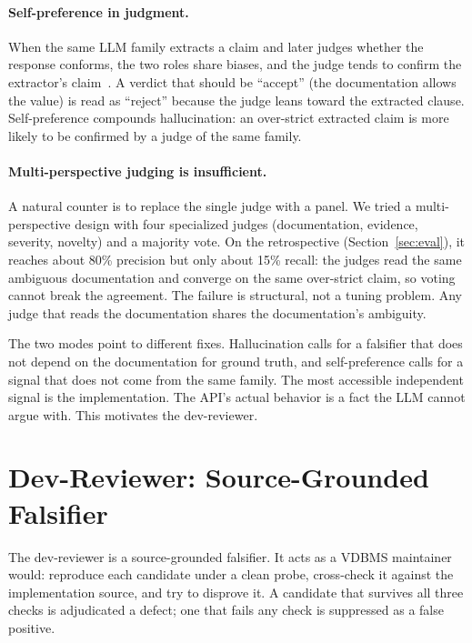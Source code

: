 \documentclass[sigconf]{acmart}
\begin{document}
\paragraph{Self-preference in judgment.}
When the same LLM family extracts a claim and later judges whether the response conforms, the two roles share biases, and the judge tends to confirm the extractor's claim~\cite{panickssery24}. A verdict that should be ``accept'' (the documentation allows the value) is read as ``reject'' because the judge leans toward the extracted clause. Self-preference compounds hallucination: an over-strict extracted claim is more likely to be confirmed by a judge of the same family.

\paragraph{Multi-perspective judging is insufficient.}
A natural counter is to replace the single judge with a panel. We tried a multi-perspective design with four specialized judges (documentation, evidence, severity, novelty) and a majority vote. On the retrospective (Section~\ref{sec:eval}), it reaches about 80\% precision but only about 15\% recall: the judges read the same ambiguous documentation and converge on the same over-strict claim, so voting cannot break the agreement. The failure is structural, not a tuning problem. Any judge that reads the documentation shares the documentation's ambiguity.

The two modes point to different fixes. Hallucination calls for a falsifier that does not depend on the documentation for ground truth, and self-preference calls for a signal that does not come from the same family. The most accessible independent signal is the implementation. The API's actual behavior is a fact the LLM cannot argue with. This motivates the dev-reviewer.

\section{Dev-Reviewer: Source-Grounded Falsifier}
\label{sec:devreviewer}

The dev-reviewer is a source-grounded falsifier. It acts as a VDBMS maintainer would: reproduce each candidate under a clean probe, cross-check it against the implementation source, and try to disprove it. A candidate that survives all three checks is adjudicated a defect; one that fails any check is suppressed as a false positive.
\end{document}
